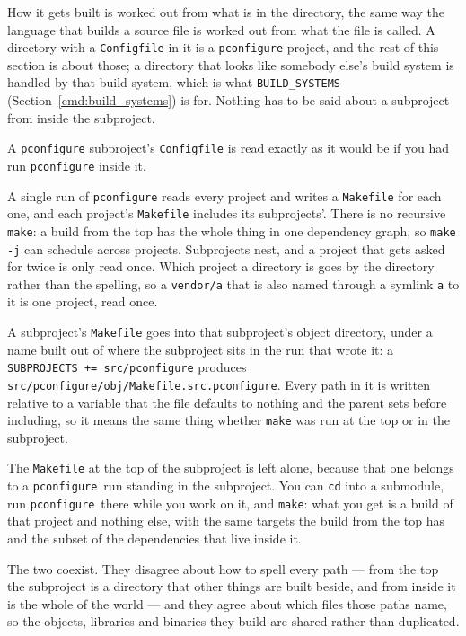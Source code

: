 \documentclass{article}
\newcommand{\pconfigure}{\texttt{pconfigure}}
\begin{document}
How it gets built is worked out from what is in the directory, the
same way the language that builds a source file is worked out from
what the file is called.  A directory with a \texttt{Configfile} in it
is a \texttt{pconfigure} project, and the rest of this section is
about those; a directory that looks like somebody else's build system
is handled by that build system, which is what
\texttt{BUILD\_SYSTEMS} (Section~\ref{cmd:build_systems}) is for.
Nothing has to be said about a subproject from inside the subproject.

A \texttt{pconfigure} subproject's \texttt{Configfile} is read exactly
as it would be if you had run \texttt{pconfigure} inside it.

A single run of \texttt{pconfigure} reads every project and writes a
\texttt{Makefile} for each one, and each project's \texttt{Makefile}
includes its subprojects'.  There is no recursive \texttt{make}: a
build from the top has the whole thing in one dependency graph, so
\texttt{make -j} can schedule across projects.  Subprojects nest,
and a project that gets asked for twice is only read once.  Which
project a directory is goes by the directory rather than the
spelling, so a \texttt{vendor/a} that is also named through a
symlink \texttt{a} to it is one project, read once.

A subproject's \texttt{Makefile} goes into that subproject's object
directory, under a name built out of where the subproject sits in the
run that wrote it: a \texttt{SUBPROJECTS += src/pconfigure} produces
\texttt{src/pconfigure/obj/Makefile.src.pconfigure}.  Every path in it
is written relative to a variable that the file defaults to nothing
and the parent sets before including, so it means the same thing
whether \texttt{make} was run at the top or in the subproject.

The \texttt{Makefile} at the top of the subproject is left alone,
because that one belongs to a \pconfigure\ run standing in the
subproject.  You can \texttt{cd} into a submodule, run \pconfigure\
there while you work on it, and \texttt{make}: what you get is a build
of that project and nothing else, with the same targets the build from
the top has and the subset of the dependencies that live inside it.

The two coexist.  They disagree about how to spell every path --- from
the top the subproject is a directory that other things are built
beside, and from inside it is the whole of the world --- and they
agree about which files those paths name, so the objects, libraries
and binaries they build are shared rather than duplicated.
\end{document}
